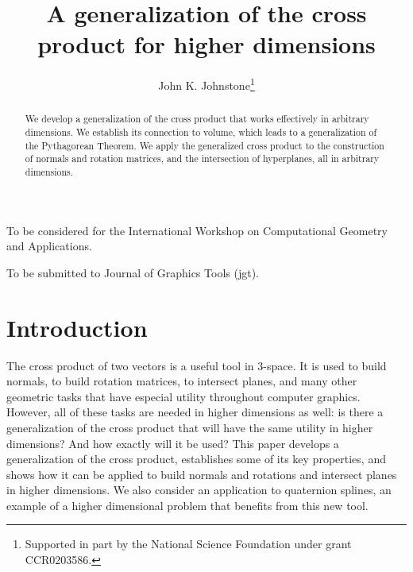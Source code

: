 \documentclass[10pt]{article}
\title{A generalization of the cross product for higher dimensions}
\author{John K. Johnstone\thanks{Supported in part by the National Science Foundation
        under grant CCR0203586.}}
\newif\iftalk
\begin{document}
\maketitle

To be considered for the International Workshop on Computational Geometry and Applications.

To be submitted to Journal of Graphics Tools (jgt).

\iftalk
What do you get when you cross a mountain climber and a mosquito?
Nothing, you can't cross a scaler and a vector.
\fi

\begin{abstract}
We develop a generalization of the cross product that works effectively in arbitrary dimensions.
We establish its connection to volume, which leads to a generalization of the Pythagorean Theorem.
We apply the generalized cross product to the construction of normals and rotation matrices, and
the intersection of hyperplanes, all in arbitrary dimensions.
\end{abstract}



\section{Introduction}


The cross product of two vectors is a useful tool in 3-space.
It is used to build normals, to build rotation matrices, to intersect planes, and
many other geometric tasks that have especial utility throughout computer graphics.
However, all of these tasks are needed in higher dimensions as well: is there
a generalization of the cross product that will have the same utility in higher dimensions?
And how exactly will it be used?
This paper develops a generalization of the cross product, establishes some of its key properties,
and shows how it can be applied to build normals and rotations and intersect planes
in higher dimensions.
We also consider an application to quaternion splines, an example of a higher dimensional
problem that benefits from this new tool.
\end{document}
